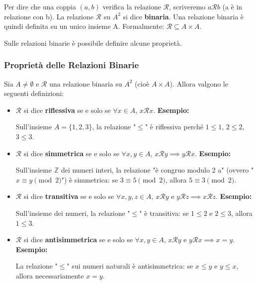 Per dire che una coppia $(a, b)$ verifica la relazione $\mathcal{R}$, scriveremo $a \mathcal{R} b$ (a è in relazione con b).
La relazione $\mathcal{R}$ su $A^2$ si dice \textbf{binaria}. Una relazione binaria è quindi definita su un unico insieme A. Formalmente: $\mathcal{R} \subseteq A \times A$.

Sulle relazioni binarie è possibile definire alcune proprietà.


\subsubsection{Proprietà delle Relazioni Binarie}
Sia $A \ne \emptyset$ e $\mathcal{R}$ una relazione binaria su $A^2$ (cioè $A \times A$). Allora valgono le seguenti definizioni:

\begin{itemize}
    \item $\mathcal{R}$ si dice \textbf{riflessiva} se e solo se $\forall x \in A$, $x \mathcal{R} x$.
    \textbf{Esempio:}
    \begin{tcolorbox}[colback=gray!10, arc=0mm, boxrule=0.5pt, left=2mm, right=2mm, top=1mm, bottom=1mm]
      Sull'insieme $A = \{1, 2, 3\}$, la relazione "$\leq$" è riflessiva perché $1 \leq 1$, $2 \leq 2$, $3 \leq 3$.
    \end{tcolorbox}

    \item $\mathcal{R}$ si dice \textbf{simmetrica} se e solo se $\forall x, y \in A$, $x \mathcal{R} y \implies y \mathcal{R} x$.
    \textbf{Esempio:}
    \begin{tcolorbox}[colback=gray!10, arc=0mm, boxrule=0.5pt, left=2mm, right=2mm, top=1mm, bottom=1mm]
      Sull'insieme $\mathbb{Z}$ dei numeri interi, la relazione "è congruo modulo 2 a" (ovvero "$x \equiv y \pmod{2}$") è simmetrica: se $3 \equiv 5 \pmod{2}$, allora $5 \equiv 3 \pmod{2}$.
    \end{tcolorbox}

    \item $\mathcal{R}$ si dice \textbf{transitiva} se e solo se $\forall x, y, z \in A$, $x \mathcal{R} y$ e $y \mathcal{R} z \implies x \mathcal{R} z$.
    \textbf{Esempio:}
    \begin{tcolorbox}[colback=gray!10, arc=0mm, boxrule=0.5pt, left=2mm, right=2mm, top=1mm, bottom=1mm]
      Sull'insieme dei numeri, la relazione "$\leq$" è transitiva: se $1 \leq 2$ e $2 \leq 3$, allora $1 \leq 3$.
    \end{tcolorbox}

    \item $\mathcal{R}$ si dice \textbf{antisimmetrica} se e solo se $\forall x, y \in A$, $x \mathcal{R} y$ e $y \mathcal{R} x \implies x = y$.
    \textbf{Esempio:}
    \begin{tcolorbox}[colback=gray!10, arc=0mm, boxrule=0.5pt, left=2mm, right=2mm, top=1mm, bottom=1mm]
      La relazione "$\leq$" sui numeri naturali è antisimmetrica: se $x \leq y$ e $y \leq x$, allora necessariamente $x = y$.
    \end{tcolorbox}
\end{itemize}


